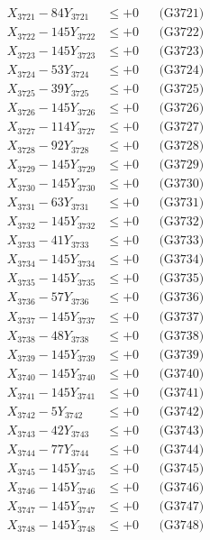 \documentclass[a4paper,10pt]{article}
\begin{document}
{\begin{align}
\allowbreak
X_{3721} - 84Y_{3721} &\leq +0 && \text{(G3721)} \\
X_{3722} - 145Y_{3722} &\leq +0 && \text{(G3722)} \\
X_{3723} - 145Y_{3723} &\leq +0 && \text{(G3723)} \\
X_{3724} - 53Y_{3724} &\leq +0 && \text{(G3724)} \\
X_{3725} - 39Y_{3725} &\leq +0 && \text{(G3725)} \\
X_{3726} - 145Y_{3726} &\leq +0 && \text{(G3726)} \\
X_{3727} - 114Y_{3727} &\leq +0 && \text{(G3727)} \\
X_{3728} - 92Y_{3728} &\leq +0 && \text{(G3728)} \\
X_{3729} - 145Y_{3729} &\leq +0 && \text{(G3729)} \\
X_{3730} - 145Y_{3730} &\leq +0 && \text{(G3730)} \\
\allowbreak
X_{3731} - 63Y_{3731} &\leq +0 && \text{(G3731)} \\
X_{3732} - 145Y_{3732} &\leq +0 && \text{(G3732)} \\
X_{3733} - 41Y_{3733} &\leq +0 && \text{(G3733)} \\
X_{3734} - 145Y_{3734} &\leq +0 && \text{(G3734)} \\
X_{3735} - 145Y_{3735} &\leq +0 && \text{(G3735)} \\
X_{3736} - 57Y_{3736} &\leq +0 && \text{(G3736)} \\
X_{3737} - 145Y_{3737} &\leq +0 && \text{(G3737)} \\
X_{3738} - 48Y_{3738} &\leq +0 && \text{(G3738)} \\
X_{3739} - 145Y_{3739} &\leq +0 && \text{(G3739)} \\
X_{3740} - 145Y_{3740} &\leq +0 && \text{(G3740)} \\
\allowbreak
X_{3741} - 145Y_{3741} &\leq +0 && \text{(G3741)} \\
X_{3742} - 5Y_{3742} &\leq +0 && \text{(G3742)} \\
X_{3743} - 42Y_{3743} &\leq +0 && \text{(G3743)} \\
X_{3744} - 77Y_{3744} &\leq +0 && \text{(G3744)} \\
X_{3745} - 145Y_{3745} &\leq +0 && \text{(G3745)} \\
X_{3746} - 145Y_{3746} &\leq +0 && \text{(G3746)} \\
X_{3747} - 145Y_{3747} &\leq +0 && \text{(G3747)} \\
X_{3748} - 145Y_{3748} &\leq +0 && \text{(G3748)} \\

\end{align}}
\end{document}
